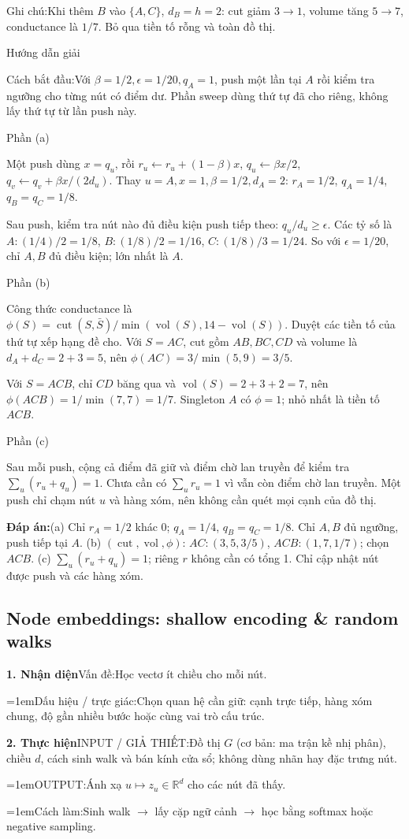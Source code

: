 \documentclass[10pt,a4paper,twocolumn]{article}
\makeatletter
\newcommand{\maptag}[1]{\phantomsection\@bsphack\protected@write\@auxout{}{\string\newlabel{#1}{{}{\thepage}{}{\@currentHref}{}}}\@esphack}
\newif\ifexamheadingprinted
\newcommand{\topic}[2]{%
  \global\examheadingprintedfalse\par\subsection{#2}\label{topic:#1}}
\newcommand{\key}[1]{#1:\enspace}
\newcommand{\solutionprompt}[1]{\par\addvspace{1pt}\noindent\key{Cách bắt đầu}#1\par\addvspace{2pt}}
\newcommand{\examnote}[1]{\par\addvspace{2pt}\noindent\key{Ghi chú}#1\par\addvspace{3pt}}
\newcommand{\blocklabel}[1]{\par\noindent#1\par\nobreak}
\newcommand{\answer}[1]{%
  \par\addvspace{3pt}%
  \blocklabel{#1Hướng dẫn giải}}
\newcommand{\finalanswer}[1]{%
  \par\addvspace{3pt}\noindent\textbf{Đáp án:}\nobreak\enspace#1\par}
\newcommand{\guidepart}[1]{%
  \par\addvspace{1.5pt}%
  \blocklabel{Phần #1}}
\newcommand{\algfield}[2]{\par\noindent\hangindent=1em\relax#1:\enspace#2}
\newcommand{\unitfield}[4]{%
  \par\noindent\textbf{#1. #2}\enspace #3:\enspace #4}
\newcommand{\algsummary}[6]{%
  \begingroup\setlength{\parskip}{1pt}%
  \unitfield{1}{Nhận diện}{Vấn đề}{#1}%
  \algfield{Dấu hiệu / trực giác}{#2}%
  \if\relax\detokenize{#3}\relax\else\par\noindent#3\par\fi%
  \unitfield{2}{Thực hiện}{INPUT / GIẢ THIẾT}{#4}%
  \algfield{OUTPUT}{#5}%
  \algfield{Cách làm}{#6}\par\endgroup}
\makeatother
\begin{document}
\examnote{Khi thêm $B$ vào $\{A,C\}$, $d_B=h=2$: cut giảm $3\to1$, volume tăng $5\to7$, conductance là $1/7$. Bỏ qua tiền tố rỗng và toàn đồ thị.}
\answer{\maptag{answer:Pr19}}
\solutionprompt{Với $\beta=1/2,\epsilon=1/20,q_A=1$, push một lần tại $A$ rồi kiểm tra ngưỡng cho từng nút có điểm dư. Phần sweep dùng thứ tự đã cho riêng, không lấy thứ tự từ lần push này.}
\guidepart{(a)}
\begin{guidesteps}
\item Một push dùng $x=q_u$, rồi $r_u\gets r_u+(1-\beta)x$, $q_u\gets\beta x/2$, $q_v\gets q_v+\beta x/(2d_u)$. Thay $u=A,x=1,\beta=1/2,d_A=2$: $r_A=1/2$, $q_A=1/4$, $q_B=q_C=1/8$.
\item Sau push, kiểm tra nút nào đủ điều kiện push tiếp theo: $q_u/d_u\ge\epsilon$. Các tỷ số là $A:(1/4)/2=1/8$, $B:(1/8)/2=1/16$, $C:(1/8)/3=1/24$. So với $\epsilon=1/20$, chỉ $A,B$ đủ điều kiện; lớn nhất là $A$.
\end{guidesteps}
\guidepart{(b)}
\begin{guidesteps}
\item Công thức conductance là $\phi(S)=\operatorname{cut}(S,\bar S)/\min(\operatorname{vol}(S),14-\operatorname{vol}(S))$. Duyệt các tiền tố của thứ tự xếp hạng đề cho. Với $S=AC$, cut gồm $AB,BC,CD$ và volume là $d_A+d_C=2+3=5$, nên $\phi(AC)=3/\min(5,9)=3/5$.
\item Với $S=ACB$, chỉ $CD$ băng qua và $\operatorname{vol}(S)=2+3+2=7$, nên $\phi(ACB)=1/\min(7,7)=1/7$. Singleton $A$ có $\phi=1$; nhỏ nhất là tiền tố $ACB$.
\end{guidesteps}
\guidepart{(c)}
\begin{guidesteps}[beginpenalty=10000]
\item Sau mỗi push, cộng cả điểm đã giữ và điểm chờ lan truyền để kiểm tra $\sum_u(r_u+q_u)=1$. Chưa cần có $\sum_u r_u=1$ vì vẫn còn điểm chờ lan truyền. Một push chỉ chạm nút $u$ và hàng xóm, nên không cần quét mọi cạnh của đồ thị.
\end{guidesteps}
\finalanswer{(a) Chỉ $r_A=1/2$ khác 0; $q_A=1/4$, $q_B=q_C=1/8$. Chỉ $A,B$ đủ ngưỡng, push tiếp tại $A$. (b) $(\operatorname{cut},\operatorname{vol},\phi)$: $AC:(3,5,3/5)$, $ACB:(1,7,1/7)$; chọn $ACB$. (c) $\sum_u(r_u+q_u)=1$; riêng $r$ không cần có tổng 1. Chỉ cập nhật nút được push và các hàng xóm.}
\topic{embedding}{Node embeddings: shallow encoding \& random walks}

\algsummary{Học vectơ ít chiều cho mỗi nút.}{Chọn quan hệ cần giữ: cạnh trực tiếp, hàng xóm chung, độ gần nhiều bước hoặc cùng vai trò cấu trúc.}{}{Đồ thị $G$ (cơ bản: ma trận kề nhị phân), chiều $d$, cách sinh walk và bán kính cửa sổ; không dùng nhãn hay đặc trưng nút.}{Ánh xạ $u\mapsto z_u\in\mathbb R^d$ cho các nút đã thấy.}{Sinh walk $\to$ lấy cặp ngữ cảnh $\to$ học bằng softmax hoặc negative sampling.}
\end{document}

